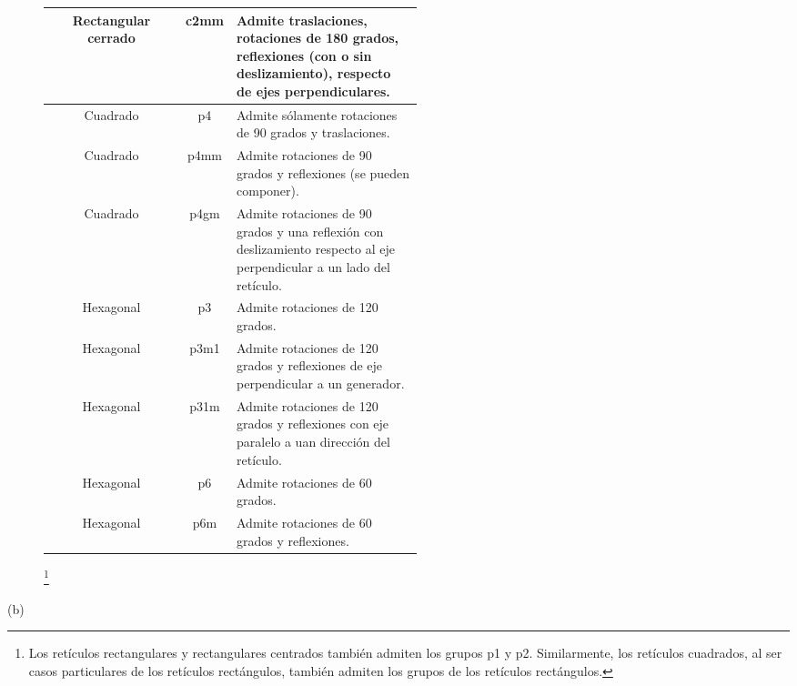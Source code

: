 \documentclass{article}
\begin{document}
\begin{sol}
\begin{description}
\begin{center}
\begin{tabular}{|c|c|p{0.5\linewidth}|}
	\hline 
	Rectangular cerrado & c2mm & Admite traslaciones, rotaciones de 180 grados, reflexiones (con o sin deslizamiento), respecto de ejes perpendiculares.\\
	\hline 
	Cuadrado & p4 & Admite sólamente rotaciones de 90 grados y traslaciones.\\
	\hline 
	Cuadrado & p4mm & Admite rotaciones de 90 grados y reflexiones (se pueden componer). \\
	\hline 
	Cuadrado & p4gm & Admite rotaciones de 90 grados y una reflexión con deslizamiento respecto al eje perpendicular a un lado del retículo. \\
	\hline 
	Hexagonal & p3 & Admite rotaciones de 120 grados. \\
	\hline 
	Hexagonal & p3m1 & Admite rotaciones de 120 grados y reflexiones de eje perpendicular a un generador. \\
	\hline 
	Hexagonal & p31m &  Admite rotaciones de 120 grados y reflexiones con eje paralelo a uan dirección del retículo.\\
	\hline 
	Hexagonal & p6 & Admite rotaciones de 60 grados. \\
	\hline 
	Hexagonal & p6m & Admite rotaciones de 60 grados y reflexiones.\\
	\hline
	\end{tabular}
	\end{center}
	\footnote{Los retículos rectangulares y rectangulares centrados también admiten los grupos p1 y p2. Similarmente, los retículos cuadrados, al ser casos particulares de los retículos rectángulos, también admiten los grupos de los retículos rectángulos.} 
\item[(b)] 
\end{description}
\end{sol}
\end{document}
